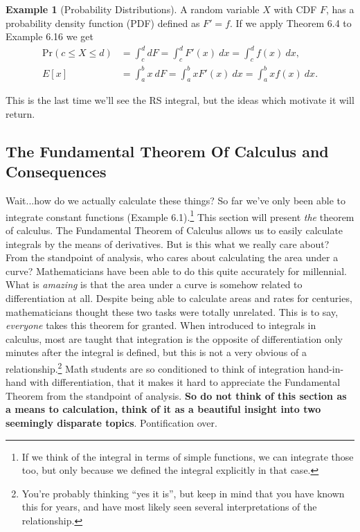 \documentclass{article}
\newcommand{\Prr}[1]{\text{Pr}\left(#1\right)}
\theoremstyle{definition}
\newtheorem{example}{Example}[section]
\begin{document}
\begin{example}[Probability Distributions]
 A random variable $ X $ with CDF $ F $, has a probability density function (PDF) defined as $ F'=f $. If we apply Theorem 6.4 to Example 6.16 we get
 \begin{align*}
 	\Prr{c\le X\le d}&=\int_{c}^{d} dF=\int_{c}^{d}F'(x)\ dx=\int_{c}^{d}f(x)\ dx,\\
 	E[x]&=\int_{a}^{b} x\ dF=\int_{a}^{b}xF'(x)\ dx=\int_{a}^{b}xf(x)\ dx.
 \end{align*}
\end{example}
This is the last time we'll see the RS integral, but the ideas which motivate it will return. 
\subsection{The Fundamental Theorem Of Calculus and Consequences}
Wait...how do we actually calculate these things? So far we've only been able to integrate constant functions (Example 6.1).\footnote{If we think of the integral in terms of simple functions, we can integrate those too, but only because we  defined the integral explicitly in that case.} This section will present \textit{the} theorem of calculus. The Fundamental Theorem of Calculus allows us to easily calculate integrals by the means of derivatives. But is this what we really care about? From the standpoint of analysis, who cares about calculating the area under a curve? Mathematicians have been able to do this quite accurately for millennial. What is \textit{amazing} is that the area under a curve is somehow related to differentiation at all. Despite being able to calculate areas and rates for centuries, mathematicians thought these two tasks were totally unrelated. This is to say, \textit{everyone} takes this theorem for granted. When introduced to integrals in calculus, most are taught that integration is the opposite of differentiation only minutes after the integral is defined, but this is not a very obvious of a relationship.\footnote{You're probably thinking ``yes it is'', but keep in mind that you have known this for years, and have most likely seen several interpretations of the relationship.} Math students are so conditioned to think of integration hand-in-hand with differentiation, that it makes it hard to appreciate the Fundamental Theorem from the standpoint of analysis. \textbf{So do not think of this section as a means to calculation, think of it as a beautiful insight into two seemingly disparate topics}. Pontification over. 
\end{document}
